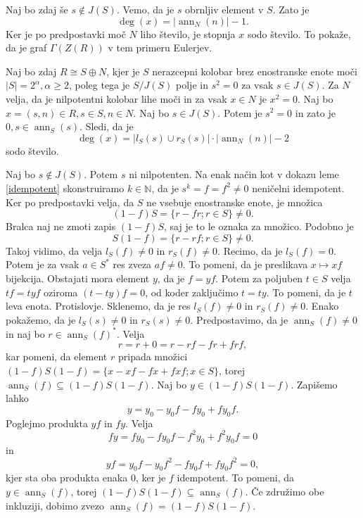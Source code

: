 \documentclass[a4paper, 12pt]{amsart}
\theoremstyle{definition} %
\theoremstyle{plain} %
\newcommand{\N}{\mathbb N}
\DeclareMathOperator{\ann}{ann}
\begin{document}
Naj bo zdaj še $s\notin J(S)$. Vemo, da je $s$ obrnljiv element v $S$. Zato je 
$$
\deg(x) = |\ann_N(n)| - 1.
$$
Ker je po predpostavki moč $N$ liho število, je stopnja $x$ sodo število. To pokaže, da je graf $\Gamma(Z(R))$ v tem primeru Eulerjev.

Naj bo zdaj $R\cong S\oplus N$, kjer je $S$ nerazcepni kolobar brez enostranske enote moči $|S| = 2^{\alpha}, \alpha \ge 2$, poleg tega je $S/J(S)$ polje in $s^2 = 0$ za vsak $s\in J(S)$. Za $N$ velja, da je nilpotentni kolobar lihe moči in za vsak $x\in N$ je $x^2 = 0$. Naj bo $x=(s,n)\in R, s\in S, n\in N$. Naj bo $s\in J(S)$. Potem je $s^2 = 0$ in zato je $0,s \in \ann_S(s)$. Sledi, da je  
$$
\deg(x) = |l_S(s) \cup r_S(s)|\cdot |\ann_N(n)| - 2
$$
sodo število.

Naj bo $s\notin J(S)$. Potem $s$ ni nilpotenten. Na enak način kot v dokazu leme \ref{idempotent} skonstruiramo $k\in \N$, da je $s^k = f = f^2\neq 0$ neničelni idempotent. Ker po predpostavki velja, da $S$ ne vsebuje enostranske enote, je množica
$$
(1-f)S = \{r-fr; r\in S\}\neq 0.
$$
Bralca naj ne zmoti zapis $(1-f)S$, saj je to le oznaka za množico. Podobno je 
$$
S(1-f) = \{r-rf;r\in S\} \neq 0.
$$
Takoj vidimo, da velja $l_S(f) \neq 0$ in $r_S(f) \neq 0$. Recimo, da je $l_S(f)=0$. Potem je za vsak $a\in S^*$ res zveza $af \neq 0$. To pomeni, da je preslikava $x\mapsto xf$ bijekcija. Obstajati mora element $y$, da je $f=yf$. Potem za poljuben $t\in S$ velja $tf = tyf$ oziroma $(t-ty)f=0 $, od koder zaključimo $t = ty$. To pomeni, da je $t$ leva enota. Protislovje. Sklenemo, da je res $l_S(f) \neq 0$ in $r_S(f) \neq 0$. Enako pokažemo, da je $l_S(s) \neq 0$ in $r_S(s) \neq 0$. Predpostavimo, da je $\ann_S(f) \neq 0$ in naj bo $r\in \ann_S(f)^*$. Velja
$$
r = r + 0 = r - rf - fr + frf, 
$$
kar pomeni, da element $r$ pripada množici $(1-f)S(1-f) = \{x-xf-fx+fxf; x\in S\}$, torej $\ann_S(f) \subseteq (1-f)S(1-f)$. Naj bo $y\in (1-f)S(1-f)$.  Zapišemo lahko
$$
y = y_0 - y_0 f -f y_0 + fy_0 f.
$$
Poglejmo produkta $yf$ in $fy$. Velja 
$$
fy = fy_0 - fy_0 f - f^2 y_0 + f^2 y_0 f = 0
$$
in
$$
yf = y_0 f - y_0 f^2 - fy_0 f + fy_0 f^2=0,
$$
kjer sta oba produkta enaka 0, ker je $f$ idempotent. To pomeni, da $y\in \ann_S(f)$, torej $(1-f)S(1-f) \subseteq \ann_S(f)$. Če združimo obe inkluziji, dobimo zvezo $\ann_S(f) = (1-f)S(1-f)$.
\end{document}
